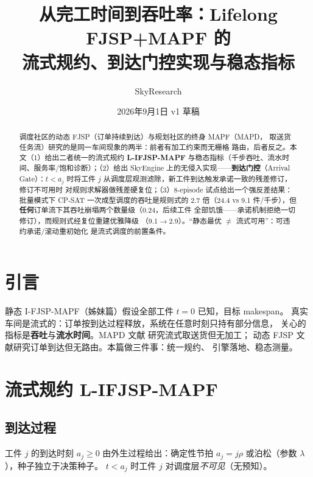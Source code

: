 \documentclass[UTF8,12pt,a4paper]{ctexart}
\title{从完工时间到吞吐率：Lifelong FJSP+MAPF 的\\流式规约、到达门控实现与稳态指标}
\author{SkyResearch}
\date{2026年9月1日 \quad v1 草稿}
\begin{document}
\maketitle

\begin{abstract}
调度社区的动态 FJSP（订单持续到达）与规划社区的终身 MAPF（MAPD，
取送货任务流）研究的是同一车间现象的两半：前者有加工约束而无栅格
路由，后者反之。本文（1）给出二者统一的流式规约 \textbf{L-IFJSP-MAPF}
与稳态指标（千步吞吐、流水时间、服务率/饱和诊断）；（2）给出 SkyEngine
上的无侵入实现——\textbf{到达门控}（Arrival Gate）：$t<a_j$ 时将工件 $j$
从调度层观测滤除，新工件到达触发承诺一致的残差修订，修订不可用时
对规则求解器做残差硬复位；（3）8-episode 试点给出一个强反差结果：
批量模式下 CP-SAT 一次成型调度的吞吐是规则式的 2.7 倍（24.4 vs 9.1
件/千步），但\textbf{任何}订单流下其吞吐崩塌两个数量级（0.24，后续工件
全部饥饿——承诺机制拒绝一切修订），而规则式经复位重建优雅降级
（9.1$\to$2.9）。``静态最优 $\neq$ 流式可用''：可违约承诺/滚动重初始化
是流式调度的前置条件。
\end{abstract}

\section{引言}

静态 I-FJSP-MAPF（姊妹篇）假设全部工件 $t{=}0$ 已知，目标 makespan。
真实车间是流式的：订单按到达过程释放，系统在任意时刻只持有部分信息，
关心的指标是\textbf{吞吐}与\textbf{流水时间}。MAPD 文献
\cite{ma2017mapd,li2021rhcr} 研究流式取送货但无加工；
动态 FJSP 文献研究订单到达但无路由。本篇做三件事：统一规约、
引擎落地、稳态测量。

\section{流式规约 L-IFJSP-MAPF}\label{sec:form}

\subsection{到达过程}
工件 $j$ 的到达时刻 $a_j\ge 0$ 由外生过程给出：确定性节拍
$a_j = j\rho$ 或泊松（参数 $\lambda$），种子独立于决策种子。
$t<a_j$ 时工件 $j$ 对调度层\emph{不可见}（无预知）。
\end{document}
